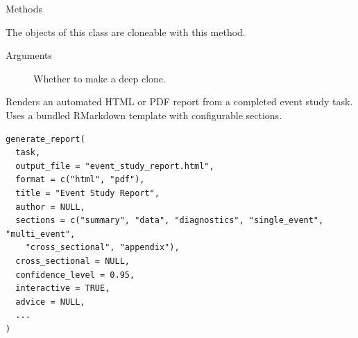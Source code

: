 \documentclass[a4paper]{book}
\begin{document}
\begin{Section}{Methods}
\begin{SubSection}{}
\end{SubSection}




\hypertarget{method-GeneralizedSignTest-clone}{}
%
\begin{SubSection}{}
The objects of this class are cloneable with this method.
%

%
\begin{SubSubSection}{Arguments}

\begin{description}

\item[] Whether to make a deep clone.

\end{description}



\end{SubSubSection}

\end{SubSection}


\end{Section}
%
\begin{Description}
Renders an automated HTML or PDF report from a completed event study task.
Uses a bundled RMarkdown template with configurable sections.
\end{Description}
%
\begin{Usage}
\begin{verbatim}
generate_report(
  task,
  output_file = "event_study_report.html",
  format = c("html", "pdf"),
  title = "Event Study Report",
  author = NULL,
  sections = c("summary", "data", "diagnostics", "single_event", "multi_event",
    "cross_sectional", "appendix"),
  cross_sectional = NULL,
  confidence_level = 0.95,
  interactive = TRUE,
  advice = NULL,
  ...
)
\end{verbatim}
\end{Usage}
%
\end{document}
